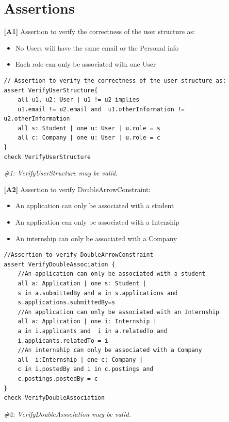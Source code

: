 \section{ Assertions}
\textbf{[A1]} Assertion to verify the correctness of the user structure as:
\begin{itemize}
    \item No Users will have the same email or the Personal info
    \item Each role can only be associated with one User
\end{itemize}
\begin{lstlisting}
// Assertion to verify the correctness of the user structure as:
assert VerifyUserStructure{
    all u1, u2: User | u1 != u2 implies 
    u1.email != u2.email and  u1.otherInformation != u2.otherInformation
    all s: Student | one u: User | u.role = s
    all c: Company | one u: User | u.role = c
}
check VerifyUserStructure
\end{lstlisting}
\textit{\#1: VerifyUserStructure may be valid.}


\textbf{[A2]} Assertion to verify DoubleArrowConstraint:
\begin{itemize}
    \item An application can only be associated with a student
    \item An application can only be associated with a Intenship
    \item An internship can only be associated with a Company
\end{itemize}
\begin{lstlisting}
//Assertion to verify DoubleArrowConstraint
assert VerifyDoubleAssociation {
    //An application can only be associated with a student
    all a: Application | one s: Student | 
    s in a.submittedBy and a in s.applications and
    s.applications.submittedBy=s
    //An application can only be associated with an Internship
    all a: Application | one i: Internship | 
    a in i.applicants and  i in a.relatedTo and
    i.applicants.relatedTo = i
    //An internship can only be associated with a Company
    all  i:Internship | one c: Company | 
    c in i.postedBy and i in c.postings and 
    c.postings.postedBy = c  
}
check VerifyDoubleAssociation
\end{lstlisting}
\textit{\#2: VerifyDoubleAssociation may be valid.}


